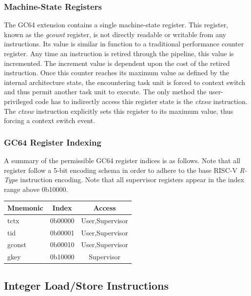 \documentclass{article}
\begin{document}
\subsubsection{Machine-State Registers}

The GC64 extension contains a single machine-state register.  This register, known as the \emph{gcount} register, is not directly readable or writable from any instructions.  Its value is similar in function to a traditional performance counter register.  Any time an instruction is retired through the pipeline, this value is incremented.  The increment value is dependent upon the cost of the retired instruction.  Once this counter reaches its maximum value as defined by the internal architecture state, the encountering task unit is forced to context switch and thus permit another task unit to execute.  The only method the user-privileged code has to indirectly access this register state is the \emph{ctxsw} instruction.  The \emph{ctxsw} instruction explicitly sets this register to its maximum value, thus forcing a context switch event.    

\newpage
\subsubsection{GC64 Register Indexing}
A summary of the permissible GC64 register indices is as follows.
Note that all register follow a 5-bit encoding schema in order to adhere
to the base RISC-V \emph{R-Type} instruction encoding.  
Note that all supervisor registers appear in the index range above 0b10000.

\begin{center}
\begin{tabular}{| l | c | c | }
\hline
Mnemonic & Index & Access \\ \hline
\hline
tctx & 0b00000 & User,Supervisor \\
\hline
tid & 0b00001 & User,Supervisor \\
\hline
gconst & 0b00010 & User,Supervisor \\
\hline
gkey & 0b10000 & Supervisor\\
\hline
\end{tabular}
\end{center}


\subsection{Integer Load/Store Instructions}
\end{document}
